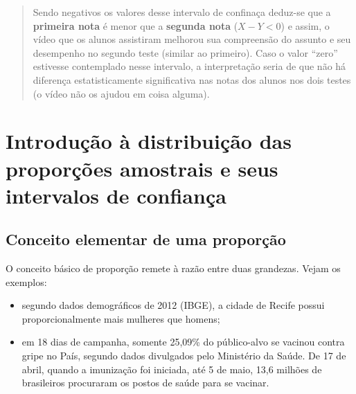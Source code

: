\documentclass[
]{book}
\providecommand{\tightlist}{%
  \setlength{\itemsep}{0pt}\setlength{\parskip}{0pt}}
\begin{document}
\hfill\break

\begin{quote}
Sendo negativos os valores desse intervalo de confinaça deduz-se que a \textbf{primeira nota} é menor que a \textbf{segunda nota} (\(X-Y < 0\)) e assim, o vídeo que os alunos assistiram melhorou sua compreensão do assunto e seu desempenho no segundo teste (similar ao primeiro). Caso o valor ``zero'' estivesse contemplado nesse intervalo, a interpretação seria de que não há diferença estatisticamente significativa nas notas dos alunos nos dois testes (o vídeo não os ajudou em coisa alguma).
\end{quote}

\hypertarget{introduuxe7uxe3o-uxe0-distribuiuxe7uxe3o-das-proporuxe7uxf5es-amostrais-e-seus-intervalos-de-confianuxe7a}{%
\chapter{Introdução à distribuição das proporções amostrais e seus intervalos de confiança}\label{introduuxe7uxe3o-uxe0-distribuiuxe7uxe3o-das-proporuxe7uxf5es-amostrais-e-seus-intervalos-de-confianuxe7a}}

\hfill\break

\hypertarget{conceito-elementar-de-uma-proporuxe7uxe3o}{%
\section{Conceito elementar de uma proporção}\label{conceito-elementar-de-uma-proporuxe7uxe3o}}

\hfill\break

O conceito básico de proporção remete à razão entre duas grandezas. Vejam os exemplos:

\hfill\break

\begin{itemize}
\tightlist
\item
  segundo dados demográficos de 2012 (IBGE), a cidade de Recife possui proporcionalmente mais mulheres que homens;\\
\item
  em 18 dias de campanha, somente 25,09\% do público-alvo se vacinou contra gripe no País, segundo dados divulgados pelo Ministério da Saúde. De 17 de abril, quando a imunização foi iniciada, até 5 de maio, 13,6 milhões de brasileiros procuraram os postos de saúde para se vacinar.
\end{itemize}

\hfill\break
\end{document}
